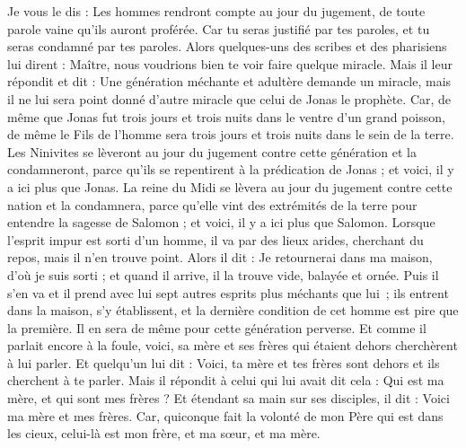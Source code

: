\begin{multicols}{2}
{Je vous le dis : Les hommes rendront compte au jour du jugement, de toute parole vaine qu'ils auront proférée.
Car tu seras justifié par tes paroles, et tu seras condamné par tes paroles.
Alors quelques-uns des scribes et des pharisiens lui dirent : Maître, nous voudrions bien te voir faire quelque miracle.
Mais il leur répondit et dit : Une génération méchante et adultère demande un miracle, mais il ne lui sera point donné d'autre miracle que celui de Jonas le prophète.
Car, de même que Jonas fut trois jours et trois nuits dans le ventre d'un grand poisson, de même le Fils de l'homme sera trois jours et trois nuits dans le sein de la terre.
Les Ninivites se lèveront au jour du jugement contre cette génération et la condamneront, parce qu'ils se repentirent à la prédication de Jonas ; et voici, il y a ici plus que Jonas.
La reine du Midi se lèvera au jour du jugement contre cette nation et la condamnera, parce qu'elle vint des extrémités de la terre pour entendre la sagesse de Salomon ; et voici, il y a ici plus que Salomon.
Lorsque l'esprit impur est sorti d'un homme, il va par des lieux arides, cherchant du repos, mais il n'en trouve point.
Alors il dit : Je retournerai dans ma maison, d'où je suis sorti ; et quand il arrive, il la trouve vide, balayée et ornée.
Puis il s'en va et il prend avec lui sept autres esprits plus méchants que lui ; ils entrent dans la maison, s’y établissent, et la dernière condition de cet homme est pire que la première. Il en sera de même pour cette génération perverse.
Et comme il parlait encore à la foule, voici, sa mère et ses frères qui étaient dehors cherchèrent à lui parler.
Et quelqu'un lui dit : Voici, ta mère et tes frères sont dehors et ils cherchent à te parler.
Mais il répondit à celui qui lui avait dit cela : Qui est ma mère, et qui sont mes frères ?
Et étendant sa main sur ses disciples, il dit : Voici ma mère et mes frères.
Car, quiconque fait la volonté de mon Père qui est dans les cieux, celui-là est mon frère, et ma sœur, et ma mère.
\TextTitle{[MYSTERES DU ROYAUME
}}
\end{multicols}

